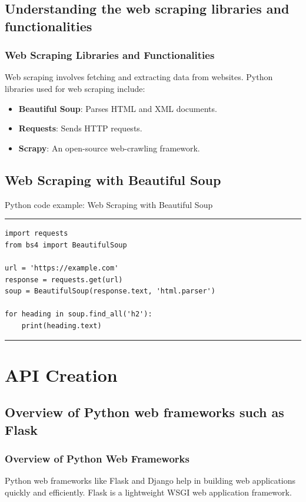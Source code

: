 \documentclass[aspectratio=169, hideothersubsections]{beamer}
\begin{document}
\subsection{Understanding the web scraping libraries and functionalities}
\begin{frame}
\frametitle{Web Scraping Libraries and Functionalities}
Web scraping involves fetching and extracting data from websites. Python libraries used for web scraping include:
\begin{itemize}
    \item \textbf{Beautiful Soup}: Parses HTML and XML documents.
    \item \textbf{Requests}: Sends HTTP requests.
    \item \textbf{Scrapy}: An open-source web-crawling framework.
\end{itemize}
\end{frame}

\subsection{Web Scraping with Beautiful Soup}
\begin{frame}[fragile]{Python code example: Web Scraping with Beautiful Soup}
\rule{\textwidth}{1pt}
\scriptsize
\begin{verbatim}
import requests
from bs4 import BeautifulSoup

url = 'https://example.com'
response = requests.get(url)
soup = BeautifulSoup(response.text, 'html.parser')

for heading in soup.find_all('h2'):
    print(heading.text)
\end{verbatim}
\rule{\textwidth}{1pt}
\end{frame}

\section{API Creation}

\subsection{Overview of Python web frameworks such as Flask}
\begin{frame}
\frametitle{Overview of Python Web Frameworks}
Python web frameworks like Flask and Django help in building web applications quickly and efficiently. Flask is a lightweight WSGI web application framework.
\end{frame}
\end{document}
